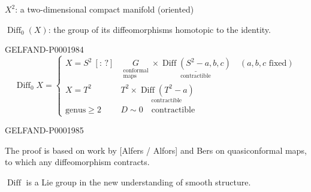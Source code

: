 





$X^2$: a two-dimensional compact manifold (oriented)



$\operatorname{Diff}_0(X)$: the group of its diffeomorphisms homotopic to the identity.






\begin{GelfandAdjacentEvidence}{GELFAND-P000198}{4}
\begin{equation*}
\operatorname{Diff}_0X=\left\{\begin{array}{ll}
X=S^2\ [\colon\,?]&\underset{\substack{\text{conformal}\\\text{maps}}}{G}\times\underset{\text{contractible}}{\underline{\operatorname{Diff}(S^2-a, b, c)}}\quad (a, b, c\text{ fixed})\\[5mm]
X=T^2&T^2\times\underset{\text{contractible}}{\operatorname{Diff}(T^2-a)}\\[5mm]
\text{genus}\geq2&D\sim0\quad\text{contractible}
\end{array}\right.
\end{equation*}



\end{GelfandAdjacentEvidence}
\begin{GelfandAdjacentEvidence}{GELFAND-P000198}{5}

The proof is based on work by [Alfers / Alfors]
and Bers on quasiconformal maps, to which any diffeomorphism contracts.



\end{GelfandAdjacentEvidence}

$\operatorname{Diff}$ is a Lie group in the new understanding of smooth structure.





